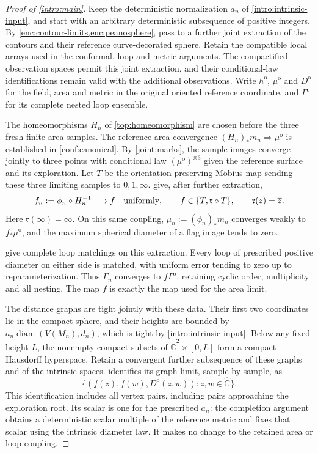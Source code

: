 \documentclass[11pt]{article}
\numberwithin{equation}{section}
\theoremstyle{definition}
\theoremstyle{remark}
\newcommand{\1}{\mathbf 1}
\begin{document}
\begin{proof}[Proof of \cref{intro:main}]
Keep the deterministic normalization $a_n$ of
\cref{intro:intrinsic-input}, and start with an arbitrary deterministic
subsequence of positive integers. By
\cref{enc:contour-limits,enc:peanosphere}, pass to a further joint
extraction of the contours and their reference curve-decorated sphere.
Retain the compatible local arrays used in the conformal, loop and
metric arguments. The compactified observation spaces permit this
joint extraction, and their conditional-law identifications remain
valid with the additional observations. Write $h^{\mathrm o}$,
$\mu^{\mathrm o}$ and $D^{\mathrm o}$ for the field, area and metric
in the original oriented reference coordinate, and
$\Gamma^{\mathrm o}$ for its complete nested loop ensemble.

The homeomorphisms $H_n$ of \cref{top:homeomorphism} are chosen before
the three fresh finite area samples. The reference area convergence
$(H_n)_*m_n\Rightarrow\mu^{\mathrm o}$ is established in
\cref{conf:canonical}. By \cref{joint:marks}, the sample images
converge jointly to three points with conditional law
$(\mu^{\mathrm o})^{\otimes3}$ given the reference surface and its
exploration. Let $T$ be the orientation-preserving
M\"obius map sending these three limiting samples to $0,1,\infty$.
 give, after further extraction,
\[
 f_n:=\phi_n\circ H_n^{-1}\longrightarrow f
 \quad\hbox{uniformly},\qquad
 f\in\{T,\mathfrak r\circ T\},
 \qquad \mathfrak r(z)=\overline z.
\]
Here $\mathfrak r(\infty)=\infty$. On this same coupling,
$\mu_n:=(\phi_n)_*m_n$ converges weakly to $f_*\mu^{\mathrm o}$,
and the maximum spherical diameter of a flag image tends to zero.

 give complete loop matchings on
this extraction. Every loop of prescribed positive diameter on either
side is matched, with uniform error tending to zero up to
reparameterization. Thus $\Gamma_n$ converges to
$f\Gamma^{\mathrm o}$, retaining cyclic order, multiplicity and all
nesting. The map $f$ is exactly the map used for the area limit.

The distance graphs are tight jointly with these data. Their first two
coordinates lie in the compact sphere, and their heights are bounded
by $a_n\operatorname{diam}(V(M_n),d_n)$, which is tight by
\cref{intro:intrinsic-input}. Below any fixed height $L$, the
nonempty compact subsets of $\widehat{\mathbb C}^2\times[0,L]$ form a compact
Hausdorff hyperspace. Retain a convergent further subsequence of these
graphs and of the intrinsic spaces.  identifies
its graph limit, sample by sample, as
\[
 \{(f(z),f(w),D^{\mathrm o}(z,w)):z,w\in\widehat{\mathbb C}\}.
\]
This identification includes all vertex pairs, including pairs
approaching the exploration root. Its scalar is one for the prescribed
$a_n$: the completion argument obtains a deterministic scalar multiple
of the reference metric and fixes that scalar using the intrinsic
diameter law. It makes no change to the retained area or loop coupling.


\end{proof}
\end{document}
